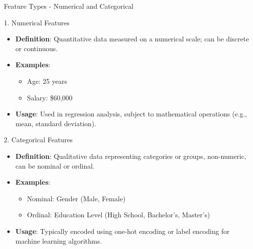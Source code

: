 \documentclass[aspectratio=169]{beamer}
\begin{document}
\begin{frame}[fragile]{Feature Types - Numerical and Categorical}
    \begin{block}{1. Numerical Features}
        \begin{itemize}
            \item \textbf{Definition}: Quantitative data measured on a numerical scale; can be discrete or continuous.
            \item \textbf{Examples}:
                \begin{itemize}
                    \item Age: 25 years
                    \item Salary: \$60,000
                \end{itemize}
            \item \textbf{Usage}: Used in regression analysis, subject to mathematical operations (e.g., mean, standard deviation).
        \end{itemize}
    \end{block}
    
    \begin{block}{2. Categorical Features}
        \begin{itemize}
            \item \textbf{Definition}: Qualitative data representing categories or groups, non-numeric, can be nominal or ordinal.
            \item \textbf{Examples}:
                \begin{itemize}
                    \item Nominal: Gender (Male, Female)
                    \item Ordinal: Education Level (High School, Bachelor's, Master's)
                \end{itemize}
            \item \textbf{Usage}: Typically encoded using one-hot encoding or label encoding for machine learning algorithms.
        \end{itemize}
    \end{block}
\end{frame}
\end{document}
